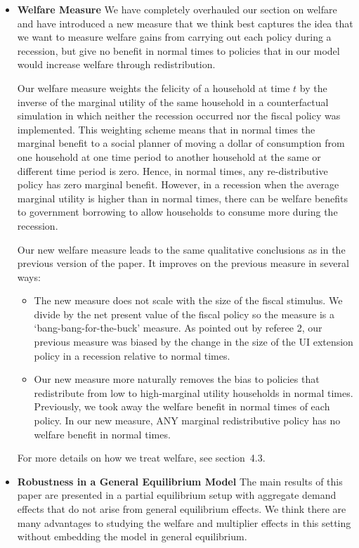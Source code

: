 \begin{itemize}
	
	\item \textbf{Welfare Measure} We have completely overhauled our section on welfare and have introduced a new measure that we think best captures the idea that we want to measure welfare gains from carrying out each policy during a recession, but give no benefit in normal times to policies that in our model would increase welfare through redistribution. 
	
	Our welfare measure weights the felicity of a household at time $t$ by the inverse of the marginal utility of the same household in a counterfactual simulation in which neither the recession occurred nor the fiscal policy was implemented. This weighting scheme means that in normal times the marginal benefit to a social planner of moving a dollar of consumption from one household at one time period to another household at the same or different time period is zero. Hence, in normal times, any re-distributive policy has zero marginal benefit. However, in a recession when the average marginal utility is higher than in normal times, there can be welfare benefits to government borrowing to allow households to consume more during the recession.
	
	Our new welfare measure leads to the same qualitative conclusions as in the previous version of the paper. It improves on the previous measure in several ways:
	\begin{itemize}
		\item The new measure does not scale with the size of the fiscal stimulus. We divide by the net present value of the fiscal policy so the measure is a `bang-bang-for-the-buck' measure. As pointed out by referee 2, our previous measure was biased by the change in the size of the UI extension policy in a recession relative to normal times.
		\item Our new measure more naturally removes the bias to policies that redistribute from low to high-marginal utility households in normal times. Previously, we took away the welfare benefit in normal times of each policy. In our new measure, ANY marginal redistributive policy has no welfare benefit in normal times.
	\end{itemize}
	For more details on how we treat welfare, see section~4.3.
	
	\item \textbf{Robustness in a General Equilibrium Model}  The main results of this paper are presented in a partial equilibrium setup with aggregate demand effects that do not arise from general equilibrium effects. We think there are many advantages to studying the welfare and multiplier effects in this setting without embedding the model in general equilibrium.
	

\end{itemize}
